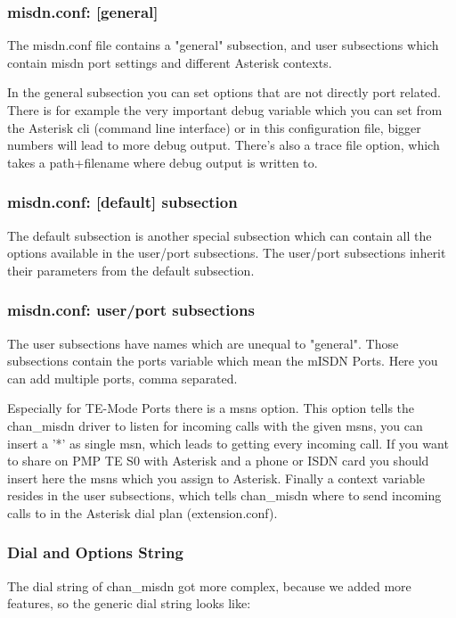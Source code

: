 \subsubsection{misdn.conf: [general]}
The misdn.conf file contains a "general" subsection, and user subsections which
contain misdn port settings and different Asterisk contexts.

In the general subsection you can set options that are not directly port
related. There is for example the very important debug variable which you can
set from the Asterisk cli (command line interface) or in this configuration
file, bigger numbers will lead to more debug output. There's also a trace file
option, which takes a path+filename where debug output is written to.

\subsubsection{misdn.conf: [default] subsection}

The default subsection is another special subsection which can contain all the
options available in the user/port subsections. The user/port subsections inherit
their parameters from the default subsection.

\subsubsection{misdn.conf: user/port subsections}

The user subsections have names which are unequal to "general". Those subsections
contain the ports variable which mean the mISDN Ports. Here you can add
multiple ports, comma separated.

Especially for TE-Mode Ports there is a msns option. This option tells the
chan\_misdn driver to listen for incoming calls with the given msns, you can
insert a '*' as single msn, which leads to getting every incoming call. If you
want to share on PMP TE S0 with Asterisk and a phone or ISDN card you should
insert here the msns which you assign to Asterisk.  Finally a context variable
resides in the user subsections, which tells chan\_misdn where to send incoming
calls to in the Asterisk dial plan (extension.conf).


\subsubsection{Dial and Options String}

The dial string of chan\_misdn got more complex, because we added more features,
so the generic dial string looks like:

